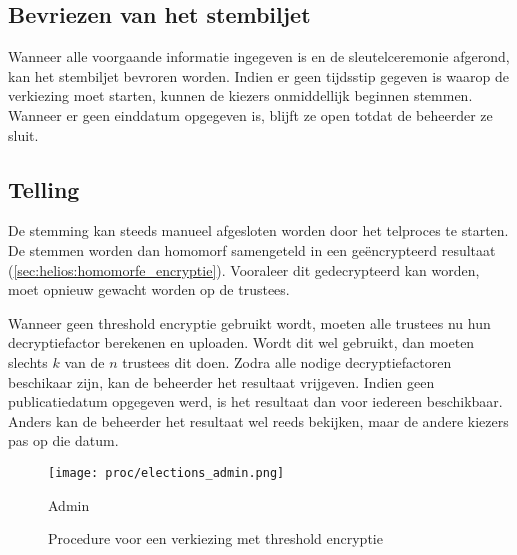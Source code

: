 \subsection{Bevriezen van het stembiljet}

Wanneer alle voorgaande informatie ingegeven is en de sleutelceremonie afgerond, kan het stembiljet bevroren worden. Indien er geen tijdsstip gegeven is waarop de verkiezing moet starten, kunnen de kiezers onmiddellijk beginnen stemmen. Wanneer er geen einddatum opgegeven is, blijft ze open totdat de beheerder ze sluit.

\subsection{Telling}

De stemming kan steeds manueel afgesloten worden door het telproces te starten. De stemmen worden dan homomorf samengeteld in een geëncrypteerd resultaat (\ref{sec:helios:homomorfe_encryptie}). Vooraleer dit gedecrypteerd kan worden, moet opnieuw gewacht worden op de trustees.

\npar Wanneer geen threshold encryptie gebruikt wordt, moeten alle trustees nu hun decryptiefactor berekenen en uploaden. Wordt dit wel gebruikt, dan moeten slechts $k$ van de $n$ trustees dit doen. Zodra alle nodige decryptiefactoren beschikaar zijn, kan de beheerder het resultaat vrijgeven. Indien geen publicatiedatum opgegeven werd, is het resultaat dan voor iedereen beschikbaar. Anders kan de beheerder het resultaat wel reeds bekijken, maar de andere kiezers pas op die datum.

\begin{figure}
  \centering
  \texttt{[image: proc/elections\_admin.png]}
  \caption{Admin}
  \label{fig:proc:elections_admin}
\end{figure}

\begin{figure}
  \centering
  \scalebox{.7}{}
  \caption{Procedure voor een verkiezing met threshold encryptie}
  \label{fig:proc:procedure_threshold}
\end{figure}